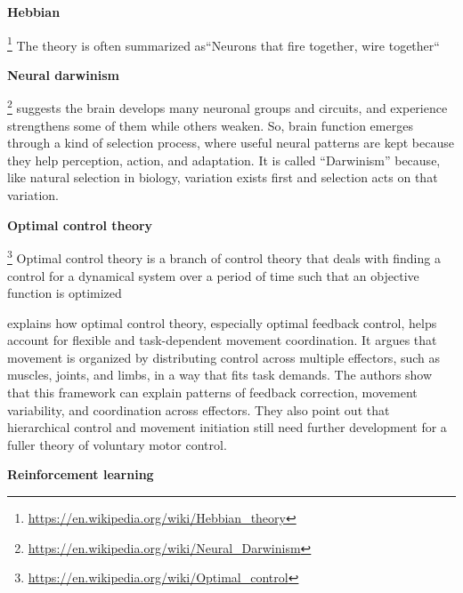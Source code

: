 \documentclass{book}
\providecommand{\ProjectDeepHeading}[2]{%
    \par\medskip\noindent\textbf{#2}\par\smallskip
}
\providecommand{\clickurlfooter}[1]{\footnote{\url{#1}}}
\begin{document}
\ProjectDeepHeading{5}{Hebbian}


\clickurlfooter{https://en.wikipedia.org/wiki/Hebbian_theory} The theory is often summarized as``Neurons that fire together, wire together``

\ProjectDeepHeading{5}{Neural darwinism}


\clickurlfooter{https://en.wikipedia.org/wiki/Neural_Darwinism} suggests the brain develops many neuronal groups and circuits, and experience strengthens some of them while others weaken.
    So, brain function emerges through a kind of selection process, where useful neural patterns are kept because they help perception, action, and adaptation. It is called “Darwinism” because, like natural selection in biology, variation exists first and selection acts on that variation.

\ProjectDeepHeading{5}{Optimal control theory}


\clickurlfooter{https://en.wikipedia.org/wiki/Optimal_control} Optimal control theory is a branch of control theory that deals with finding a control for a dynamical system over a period of time such that an objective function is optimized
    
    \cite{diedrichsen-2009-the-coordination-of-movement-optimal-feedback-control-and-beyond} explains how optimal control theory, especially optimal feedback control, helps account for flexible and task-dependent movement coordination. It argues that movement is organized by distributing control across multiple effectors, such as muscles, joints, and limbs, in a way that fits task demands.
    The authors show that this framework can explain patterns of feedback correction, movement variability, and coordination across effectors. They also point out that hierarchical control and movement initiation still need further development for a fuller theory of voluntary motor control.

\ProjectDeepHeading{5}{Reinforcement learning}

\end{document}
